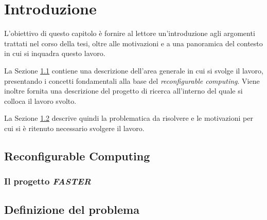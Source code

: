 \chapter{Introduzione}
\label{chap:intro}
\vspace{1cm}
L'obiettivo di questo capitolo è fornire al lettore un'introduzione agli argomenti 
trattati nel corso della tesi, oltre alle motivazioni e a una panoramica del contesto in 
cui si inquadra questo lavoro.

La Sezione \ref{sec:reconfComp} contiene una descrizione dell'area generale in cui si 
svolge il lavoro, presentando i concetti fondamentali alla base del \emph{reconfigurable 
computing}. Viene inoltre fornita una descrizione del progetto di ricerca all'interno del 
quale si colloca il lavoro svolto.

La Sezione \ref{sec:definizioneProblema} descrive quindi la problematica da risolvere e 
le motivazioni per cui si è ritenuto necessario svolgere il lavoro.


\section{Reconfigurable Computing}
\label{sec:reconfComp}


\subsection{Il progetto \emph{FASTER}}
\label{sec:progettoFaster}


\section{Definizione del problema}
\label{sec:definizioneProblema}

